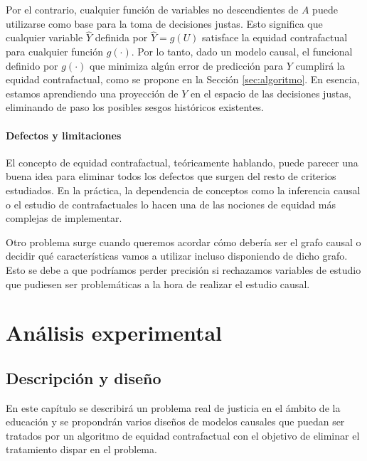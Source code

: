 \documentclass[oneside,openright,titlepage,numbers=noenddot,openany,headinclude,footinclude=true,
cleardoublepage=empty,abstractoff,BCOR=5mm,paper=a4,fontsize=12pt,main=spanish]{scrreprt}
\begin{document}
Por el contrario, cualquier función de variables no descendientes de $A$ puede utilizarse como base para la toma de decisiones justas. Esto significa que cualquier variable $\hat{Y}$ definida por $\hat{Y} = g(U)$ satisface la equidad contrafactual para cualquier función $g(\cdot)$. Por lo tanto, dado un modelo causal, el funcional definido por $g(\cdot)$ que minimiza algún error de predicción para $Y$ cumplirá la equidad contrafactual, como se propone en la Sección \ref{sec:algoritmo}. En esencia, estamos aprendiendo una proyección de $Y$ en el espacio de las decisiones justas, eliminando de paso los posibles sesgos históricos existentes.

\subsection*{Defectos y limitaciones}

El concepto de equidad contrafactual, teóricamente hablando, puede parecer una buena idea para eliminar todos los defectos que surgen del resto de criterios estudiados. En la práctica, la dependencia de conceptos como la inferencia causal o el estudio de contrafactuales lo hacen una de las nociones de equidad más complejas de implementar. 

Otro problema surge cuando queremos acordar cómo debería ser el grafo causal o decidir qué características vamos a utilizar incluso disponiendo de dicho grafo. Esto se debe a que podríamos perder precisión si rechazamos variables de estudio que pudiesen ser problemáticas a la hora de realizar el estudio causal.

\part{Análisis experimental}  \label{part:analisis_exp}


\chapter{Descripción y diseño}

\label{ch:descdise}

En este capítulo se describirá un problema real de justicia en el ámbito de la educación y se propondrán varios diseños de modelos causales que puedan ser tratados por un algoritmo de equidad contrafactual con el objetivo de eliminar el tratamiento dispar en el problema.
\end{document}
